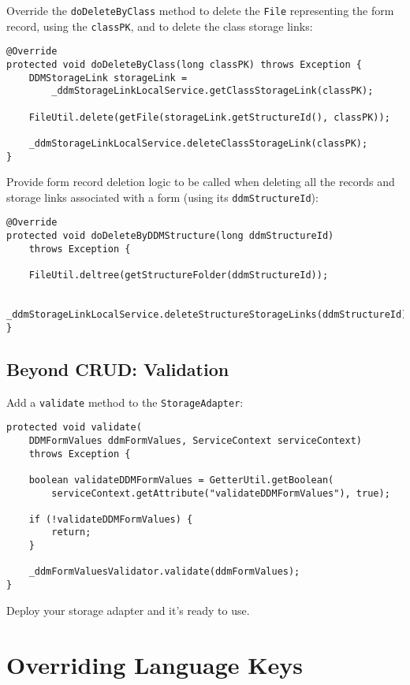 Override the \texttt{doDeleteByClass} method to delete the \texttt{File}
representing the form record, using the \texttt{classPK}, and to delete
the class storage links:

\begin{verbatim}
@Override
protected void doDeleteByClass(long classPK) throws Exception {
    DDMStorageLink storageLink =
        _ddmStorageLinkLocalService.getClassStorageLink(classPK);

    FileUtil.delete(getFile(storageLink.getStructureId(), classPK));

    _ddmStorageLinkLocalService.deleteClassStorageLink(classPK);
}
\end{verbatim}

Provide form record deletion logic to be called when deleting all the
records and storage links associated with a form (using its
\texttt{ddmStructureId}):

\begin{verbatim}
@Override
protected void doDeleteByDDMStructure(long ddmStructureId)
    throws Exception {

    FileUtil.deltree(getStructureFolder(ddmStructureId));

    _ddmStorageLinkLocalService.deleteStructureStorageLinks(ddmStructureId);
}
\end{verbatim}

\section{Beyond CRUD: Validation}\label{beyond-crud-validation}

Add a \texttt{validate} method to the \texttt{StorageAdapter}:

\begin{verbatim}
protected void validate(
    DDMFormValues ddmFormValues, ServiceContext serviceContext)
    throws Exception {

    boolean validateDDMFormValues = GetterUtil.getBoolean(
        serviceContext.getAttribute("validateDDMFormValues"), true);

    if (!validateDDMFormValues) {
        return;
    }

    _ddmFormValuesValidator.validate(ddmFormValues);
}
\end{verbatim}

Deploy your storage adapter and it's ready to use.

\chapter{Overriding Language Keys}\label{overriding-language-keys}

